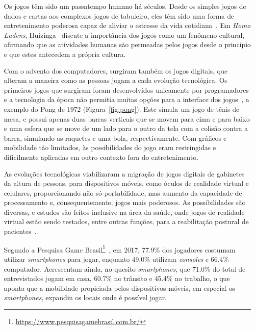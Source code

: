 Os jogos têm sido um passatempo humano há séculos. Desde os simples jogos de dados e cartas aos complexos jogos de tabuleiro, eles têm sido uma forma de entretenimento poderosa capaz de aliviar o estresse da vida cotidiana~\cite{netzley_how_2015}. Em \textit{Homo Ludens}, Huizinga~\cite{huizinga_homo_1980} discute a importância dos jogos como um fenômeno cultural, afirmando que as atividades humanas são permeadas pelos jogos desde o princípio e que estes antecedem a própria cultura. 

Com o advento dos computadores, surgiram também os jogos digitais, que alteram  a maneira como as pessoas jogam a cada evolução tecnológica. Os primeiros jogos que surgiram foram desenvolvidos unicamente por programadores e a tecnologia da época não permitia muitas opções para a interface dos jogos~\cite[~p. 16-50]{mendes_estilo_2013}, a exemplo do Pong de 1972 (Figura~\ref{fig:pong}). Este simula um jogo de tênis de mesa, e possui apenas duas barras verticais que se movem para cima e para baixo e uma esfera que se move de um lado para o outro da tela com a colisão contra a barra, simulando as raquetes e uma bola, respectivamente. Com gráficos e mobilidade tão limitados, às possibilidades do jogo eram restringidas e dificilmente aplicadas em outro contexto fora do entretenimento.


As evoluções tecnológicas viabilizaram a migração de jogos digitais de gabinetes da altura de pessoas, para dispositivos móveis, como óculos de realidade virtual e celulares, proporcionando não só portabilidade, mas aumento da capacidade de processamento e, consequentemente, jogos mais poderosos. As possibilidades são diversas, e estudos são feitos inclusive na área da saúde, onde jogos de realidade virtual estão sendo testados, entre outras funções, para a reabilitação postural de pacientes~\cite{lima_reabilitacao_2017}.

Segundo a Pesquisa Game Brasil\footnote{\url{https://www.pesquisagamebrasil.com.br/}}~\cite{sioux_pesquisa_2017}, em 2017, 77.9\% dos jogadores costumam utilizar \textit{smartphones} para jogar, enquanto 49.0\% utilizam \textit{consoles} e 66.4\% computador. Acrescentam ainda, no quesito \textit{smartphones}, que 71.0\% do total de entrevistados jogam em casa, 60.7\% no trânsito e 45.4\% no trabalho, o que aponta que a mobilidade propiciada pelos dispositivos móveis, em especial os \textit{smartphones},  expandiu os locais onde é possível jogar.


